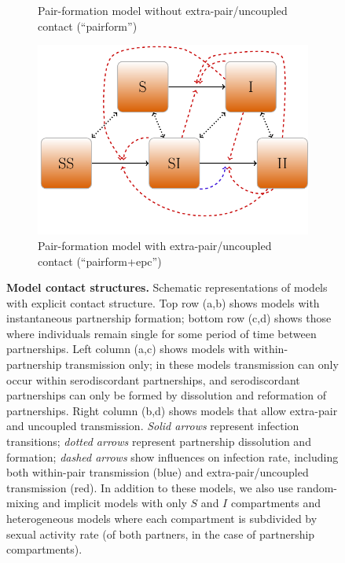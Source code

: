 \documentclass[10pt,letterpaper]{article}
\begin{document}
\begin{figure}[t!p]
\begin{subfigure}[b]{0.4\linewidth}
	\centering
\caption{Pair-formation model without extra-pair/uncoupled contact 
(``pairform'')}
\end{subfigure}
\begin{subfigure}[b]{0.4\linewidth}
	\centering
	  \includegraphics[width=0.9\linewidth]{../figures/tikz-f4}
\caption{Pair-formation model with extra-pair/uncoupled contact
(``pairform+epc'')}
\end{subfigure}

\caption{{\bf Model contact structures.} 
Schematic representations of models with
explicit contact structure. Top row (a,b) shows models with instantaneous
partnership formation; bottom row (c,d)  shows those where individuals remain
single for some period of time between partnerships. Left column (a,c) 
shows models with within-partnership transmission only; in these models
transmission can only occur within serodiscordant partnerships, and
serodiscordant partnerships can only be formed by dissolution
and reformation of partnerships. Right column (b,d) shows models
that allow extra-pair and uncoupled transmission.
\emph{Solid arrows} represent infection transitions; \emph{dotted arrows}
represent partnership dissolution and formation; \emph{dashed arrows}
show influences on infection rate, including both within-pair
transmission (blue) and extra-pair/uncoupled transmission (red).
In addition to these models, we also use random-mixing and implicit
models with only $S$ and $I$ compartments and heterogeneous models
where each compartment is subdivided by sexual activity rate
(of both partners, in the case of partnership compartments).
}
\label{fig:diagrams}
\end{figure}
\end{document}
